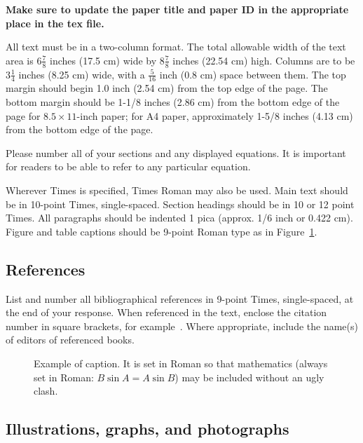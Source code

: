 \documentclass[10pt,twocolumn,letterpaper]{article}
\begin{document}
{\bf Make sure to update the paper title and paper ID in the appropriate place in the tex file.}

All text must be in a two-column format. The total allowable width of the text
area is $6\frac78$ inches (17.5 cm) wide by $8\frac78$ inches (22.54 cm) high.
Columns are to be $3\frac14$ inches (8.25 cm) wide, with a $\frac{5}{16}$ inch
(0.8 cm) space between them. The top margin should begin
1.0 inch (2.54 cm) from the top edge of the page.  The bottom margin should be
1-1/8 inches (2.86 cm) from the bottom edge of the page for $8.5 \times
11$-inch paper; for A4 paper, approximately 1-5/8 inches (4.13 cm) from the
bottom edge of the page.

Please number all of your sections and any displayed equations.  It is important
for readers to be able to refer to any particular equation.

Wherever Times is specified, Times Roman may also be used.  Main text should be
in 10-point Times, single-spaced. Section headings should be in 10 or 12 point
Times.  All paragraphs should be indented 1 pica (approx. 1/6 inch or 0.422
cm).  Figure and table captions should be 9-point Roman type as in
Figure~\ref{fig:onecol}.

\subsection{References}

List and number all bibliographical references in 9-point Times, single-spaced,
at the end of your response. When referenced in the text, enclose the citation
number in square brackets, for example~\cite{Authors14}.  Where appropriate,
include the name(s) of editors of referenced books.

\begin{figure}[t]
\begin{center}
\fbox{\rule{0pt}{1.8in} \rule{0.9\linewidth}{0pt}}
\end{center}
   \caption{Example of caption.  It is set in Roman so that mathematics
   (always set in Roman: $B \sin A = A \sin B$) may be included without an
   ugly clash.}
\label{fig:long}
\label{fig:onecol}
\end{figure}

\subsection{Illustrations, graphs, and photographs}
\end{document}
